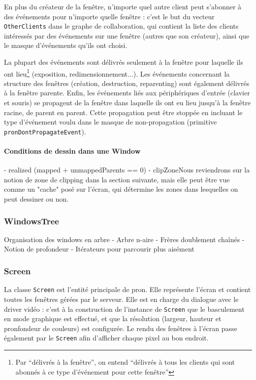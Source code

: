 En plus du créateur de la fenêtre, n'importe quel autre client peut s'abonner à des événements pour n'importe quelle fenêtre : c'est le but du vecteur \verb|OtherClients| dans le graphe de collaboration, qui contient la liste des clients intéressés par des événements sur une fenêtre (autres que son créateur), ainsi que le masque d'événements qu'ils ont choisi.

La plupart des événements sont délivrés seulement à la fenêtre pour laquelle ils ont lieu\footnote{Par ``délivrés à la fenêtre'', on entend ``délivrés à tous les clients qui sont abonnés à ce type d'événement pour cette fenêtre''} (exposition, redimensionnement...). Les événements concernant la structure des fenêtres (création, destruction, reparenting) sont également délivrés à la fenêtre parente. Enfin, les événements liés aux périphériques d'entrée (clavier et souris) se propagent de la fenêtre dans laquelle ils ont eu lieu jusqu'à la fenêtre racine, de parent en parent. Cette propagation peut être stoppée en incluant le type d'événement voulu dans le masque de non-propagation (primitive \verb|pronDontPropagateEvent|).

\paragraph{Conditions de dessin dans une Window}
- realized (mapped + unmappedParents == 0)
- clipZoneNous reviendrons sur la notion de zone de clipping dans la section suivante, mais elle peut être vue comme un "cache" posé sur l'écran, qui détermine les zones dans lesquelles on peut dessiner ou non.

\subsubsection{WindowsTree}
Organisation des windows en arbre
- Arbre n-aire
- Frères doublement chaînés
- Notion de profondeur
- Itérateurs pour parcourir plus aisément

\subsubsection{Screen}

La classe \verb|Screen| est l'entité principale de pron. Elle représente l'écran et contient toutes les fenêtres gérées par le serveur. Elle est en charge du dialogue avec le driver vidéo : c'est à la construction de l'instance de \verb|Screen| que le basculement en mode graphique est effectué, et que la résolution (largeur, hauteur et pronfondeur de couleurs) est configurée. Le rendu des fenêtres à l'écran passe également par le \verb|Screen| afin d'afficher chaque pixel au bon endroit.

